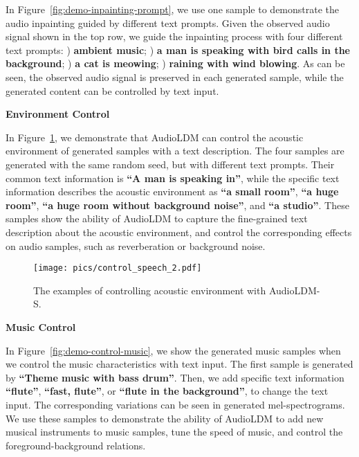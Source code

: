 \documentclass{article}
\begin{document}
In Figure~\ref{fig:demo-inpainting-prompt}, we use one sample to demonstrate the audio inpainting guided by different text prompts. Given the observed audio signal shown in the top row, we guide the inpainting process with four different text prompts: ) \textbf{ambient music}; ) \textbf{a man is speaking with bird calls in the background}; ) \textbf{a cat is meowing}; ) \textbf{raining with wind blowing}. As can be seen, the observed audio signal is preserved in each generated sample, while the generated content can be controlled by text input.   

\newpage

\vspace{0.5cm}

\textbf{Environment Control}

In Figure~\ref{fig:demo-control-speech}, we demonstrate that AudioLDM can control the acoustic environment of generated samples with a text description. The four samples are generated with the same random seed, but with different text prompts. Their common text information is \textbf{``A man is speaking in''}, while the specific text information describes the acoustic environment as \textbf{``a small room''}, \textbf{``a huge room''}, \textbf{``a huge room without background noise''}, and \textbf{``a studio''}. These samples show the ability of AudioLDM to capture the fine-grained text description about the acoustic environment, and control the corresponding effects on audio samples, such as reverberation or background noise.   
\vspace{0.5cm}

\begin{figure}[H]
    \centering
    \texttt{[image: pics/control\_speech\_2.pdf]}
    \caption{The examples of controlling acoustic environment with AudioLDM-S.}
    \label{fig:demo-control-speech}
\end{figure}


\newpage

\textbf{Music Control}

In Figure~\ref{fig:demo-control-music}, we show the generated music samples when we control the music characteristics with text input. The first sample is generated by \textbf{``Theme music with bass drum''}. Then, we add specific text information \textbf{``flute''}, \textbf{``fast, flute''}, or \textbf{``flute in the background''}, to change the text input. The corresponding variations can be seen in generated mel-spectrograms. We use these samples to demonstrate the ability of AudioLDM to add new musical instruments to music samples, tune the speed of music, and control the foreground-background relations. 
\end{document}
